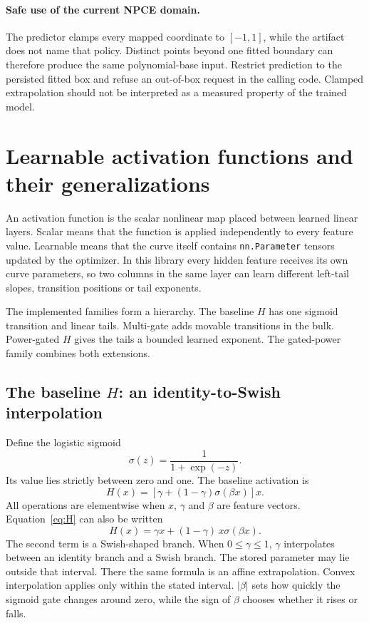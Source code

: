 \documentclass[10pt,aps,prd,twocolumn,nofootinbib]{revtex4-2}
\newcommand{\code}[1]{\texttt{#1}}
\begin{document}
\paragraph{Safe use of the current NPCE domain.}
The predictor clamps every mapped coordinate to \([-1,1]\), while the artifact
does not name that policy.  Distinct points beyond one fitted boundary can
therefore produce the same polynomial-base input.  Restrict prediction to the
persisted fitted box and refuse an out-of-box request in the calling code.
Clamped extrapolation should not be interpreted as a measured property of the
trained model.

\section{Learnable activation functions and their generalizations}
\label{sec:activations}

An activation function is the scalar nonlinear map placed between learned
linear layers.  Scalar means that the function is applied independently to
every feature value.  Learnable means that the curve itself contains
\code{nn.Parameter} tensors updated by the optimizer.  In this library every
hidden feature receives its own curve parameters, so two columns in the same
layer can learn different left-tail slopes, transition positions or tail
exponents.

The implemented families form a hierarchy.  The baseline \(H\) has one
sigmoid transition and linear tails.  Multi-gate adds movable transitions in
the bulk.  Power-gated \(H\) gives the tails a bounded learned exponent.  The
gated-power family combines both extensions.

\subsection{The baseline \(H\): an identity-to-Swish interpolation}

Define the logistic sigmoid
\begin{equation*}
  \sigma(z)=\frac{1}{1+\exp(-z)}.
\end{equation*}
Its value lies strictly between zero and one.  The baseline activation is
\begin{equation}
 H(x)=\left[\gamma+(1-\gamma)\sigma(\beta x)\right]x.
 \label{eq:H}
\end{equation}
All operations are elementwise when \(x\), \(\gamma\) and \(\beta\) are
feature vectors.  Equation~\eqref{eq:H} can also be written
\begin{equation*}
 H(x)=\gamma x+(1-\gamma)\,x\sigma(\beta x).
\end{equation*}
The second term is a Swish-shaped branch.  When $0\le\gamma\le1$,
\(\gamma\) interpolates between an identity branch and a Swish branch.  The
stored parameter may lie outside that interval.  There the same formula is an
affine extrapolation.  Convex interpolation applies only within the stated
interval.
$|\beta|$ sets how quickly the sigmoid gate changes around zero, while the
sign of \(\beta\) chooses whether it rises or falls.
\end{document}
